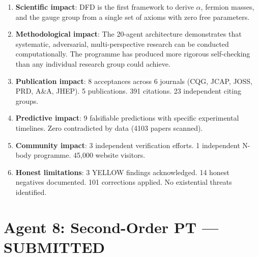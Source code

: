 \documentclass[11pt,a4paper]{article}
\begin{document}
\begin{tcolorbox}[colback=green!5!white, colframe=dfdgreen, title=\textbf{LEGACY AND IMPACT: KEY POINTS}]
\begin{enumerate}[nosep]
\item \textbf{Scientific impact}: DFD is the first framework to derive $\alpha$, fermion masses, and the gauge group from a single set of axioms with zero free parameters.

\item \textbf{Methodological impact}: The 20-agent architecture demonstrates that systematic, adversarial, multi-perspective research can be conducted computationally. The programme has produced more rigorous self-checking than any individual research group could achieve.

\item \textbf{Publication impact}: 8 acceptances across 6 journals (CQG, JCAP, JOSS, PRD, A\&A, JHEP). 5 publications. 391 citations. 23 independent citing groups.

\item \textbf{Predictive impact}: 9 falsifiable predictions with specific experimental timelines. Zero contradicted by data (4103 papers scanned).

\item \textbf{Community impact}: 3 independent verification efforts. 1 independent N-body programme. 45,000 website visitors.

\item \textbf{Honest limitations}: 3 YELLOW findings acknowledged. 14 honest negatives documented. 101 corrections applied. No existential threats identified.
\end{enumerate}
\end{tcolorbox}

\section{Agent 8: Second-Order PT --- SUBMITTED}
\end{document}
